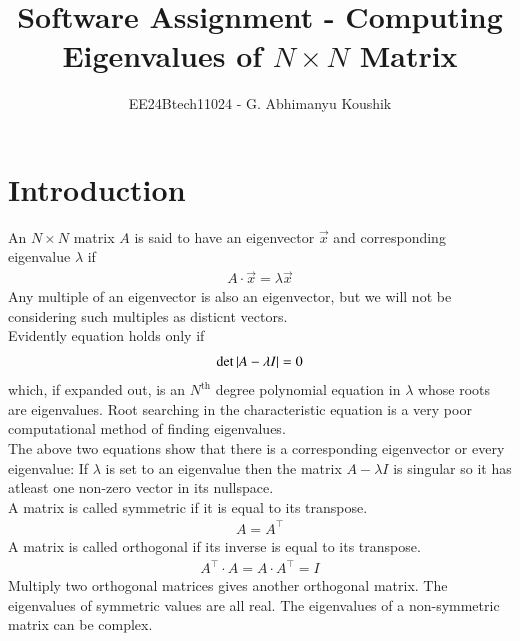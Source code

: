 \documentclass[a4paper,12pt]{article}
\theoremstyle{remark}
\begin{document}
\title{Software Assignment - Computing Eigenvalues of $N \times N$ Matrix}
\author{EE24Btech11024 - G. Abhimanyu Koushik}
\maketitle
\renewcommand{\thefigure}{\theenumi}
\renewcommand{\thetable}{\theenumi}

\section*{Introduction}
An $N\times N$ matrix $A$ is said to have an eigenvector $\vec{x}$ and corresponding eigenvalue $\lambda$ if
\begin{align}
	A\cdot\vec{x} = \lambda\vec{x}
\end{align}
Any multiple of an eigenvector is also an eigenvector, but we will not be considering such multiples as disticnt vectors.\\
Evidently equation  holds only if
\begin{align}
	\det\left\vert A-\lambda I\right\vert = 0
\end{align}
which, if expanded out, is an $N^{\text{th}}$ degree polynomial equation in $\lambda$ whose roots are eigenvalues. Root searching in the characteristic equation  is a very poor computational method of finding eigenvalues.\\
The above two equations show that there is a corresponding eigenvector or every eigenvalue: If $\lambda$ is set to an eigenvalue then the matrix $A-\lambda I$ is singular so it has atleast one non-zero vector in its nullspace.\\
A matrix is called symmetric if it is equal to its transpose.
\begin{align}
	A = A^\top
\end{align}
A matrix is called orthogonal if its inverse is equal to its transpose.
\begin{align}
	A^\top\cdot A = A\cdot A^\top = I
\end{align}
Multiply two orthogonal matrices gives another orthogonal matrix.
The eigenvalues of symmetric values are all real. The eigenvalues of a non-symmetric matrix can be complex. 
\end{document}
